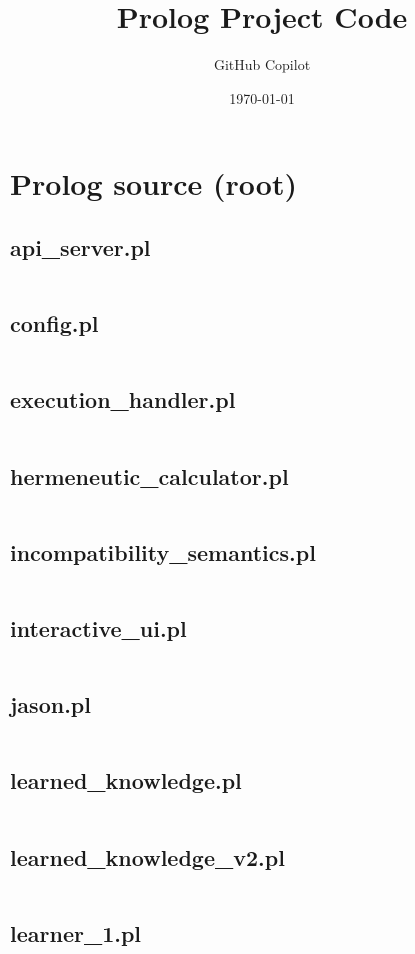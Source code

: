 \documentclass{article}
\title{Prolog Project Code}
\author{GitHub Copilot}
\date{\today}
\begin{document}
\maketitle
\tableofcontents
\newpage

\section{Prolog source (root)}
\subsection{api\_server.pl}
\inputminted{prolog}{api_server.pl}
\subsection{config.pl}
\inputminted{prolog}{config.pl}
\subsection{execution\_handler.pl}
\inputminted{prolog}{execution_handler.pl}
\subsection{hermeneutic\_calculator.pl}
\inputminted{prolog}{hermeneutic_calculator.pl}
\subsection{incompatibility\_semantics.pl}
\inputminted{prolog}{incompatibility_semantics.pl}
\subsection{interactive\_ui.pl}
\inputminted{prolog}{interactive_ui.pl}
\subsection{jason.pl}
\inputminted{prolog}{jason.pl}
\subsection{learned\_knowledge.pl}
\inputminted{prolog}{learned_knowledge.pl}
\subsection{learned\_knowledge\_v2.pl}
\inputminted{prolog}{learned_knowledge_v2.pl}
\subsection{learner\_1.pl}
\inputminted{prolog}{learner_1.pl}
\end{document}

